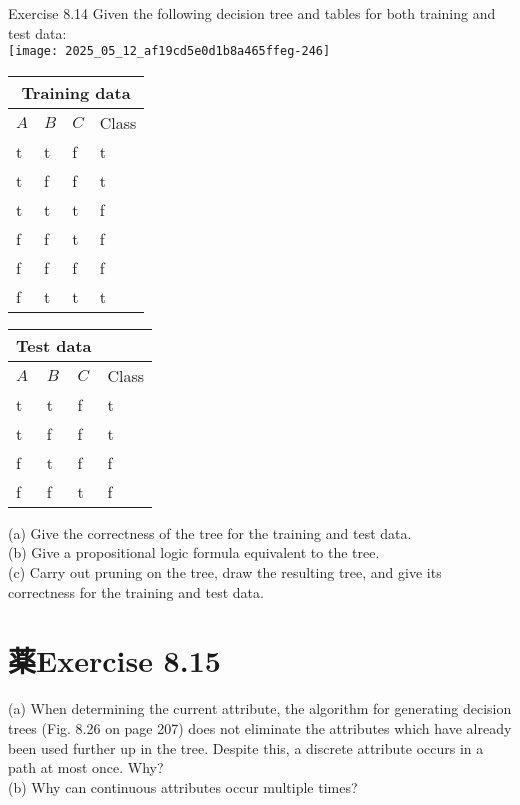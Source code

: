 \documentclass[10pt]{article}
\begin{document}
Exercise 8.14 Given the following decision tree and tables for both training and test data:\\
\texttt{[image: 2025\_05\_12\_af19cd5e0d1b8a465ffeg-246]}

\begin{center}
\begin{tabular}{llll}
\multicolumn{4}{c}{Training data} \\
\hline
$A$ & $B$ & $C$ & Class \\
\hline
t & t & f & t \\
\hline
t & f & f & t \\
\hline
t & t & t & f \\
\hline
f & f & t & f \\
\hline
f & f & f & f \\
\hline
f & t & t & t \\
\hline
\end{tabular}
\end{center}

\begin{center}
\begin{tabular}{llll}
\multicolumn{3}{c}{Test data} &  \\
\hline
$A$ & $B$ & $C$ & Class \\
\hline
t & t & f & t \\
\hline
t & f & f & t \\
\hline
f & t & f & f \\
\hline
f & f & t & f \\
\hline
\end{tabular}
\end{center}

(a) Give the correctness of the tree for the training and test data.\\
(b) Give a propositional logic formula equivalent to the tree.\\
(c) Carry out pruning on the tree, draw the resulting tree, and give its correctness for the training and test data.

\section*{薬Exercise 8.15}
(a) When determining the current attribute, the algorithm for generating decision trees (Fig. 8.26 on page 207) does not eliminate the attributes which have already been used further up in the tree. Despite this, a discrete attribute occurs in a path at most once. Why?\\
(b) Why can continuous attributes occur multiple times?
\end{document}
